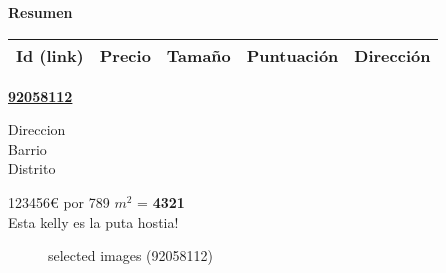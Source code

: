 \documentclass[10pt,a4paper]{report}
\begin{document}
{\LARGE \textbf{Resumen}}

\begin{center}
\begin{tabular}{|c|c|c|c|c|}
\hline
Id (link) & Precio & Tamaño & Puntuación & Dirección \\\hline\hline
\end{tabular}
\end{center}


\newpage
\hypertarget{casa92058112}{}
\begin{center}
\begin{large}
\href{https://www.idealista.com/inmueble/92058112}{\textbf{92058112}}\\[10px]
\end{large}
Direccion\\
Barrio\\
Distrito\\
\end{center}
{\large 123456€ por 789 $m^2$ = \color{blue} \textbf{4321}}\\[20px]
Esta kelly es la puta hostia!
\begin{figure}[htbp]
\caption{selected images (92058112)}
\end{figure}

\end{document}
